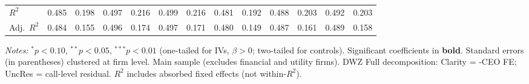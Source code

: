 \begin{landscape}
\begin{table}[H]
\begin{tabular}{lcccccccccccc}
$R^2$ & 0.485 & 0.198 & 0.497 & 0.216 & 0.499 & 0.216 & 0.481 & 0.192 & 0.488 & 0.203 & 0.492 & 0.203 \\
Adj.~$R^2$ & 0.484 & 0.155 & 0.496 & 0.174 & 0.497 & 0.171 & 0.480 & 0.149 & 0.487 & 0.161 & 0.489 & 0.158 \\
\bottomrule
\end{tabular}
\begin{minipage}{\linewidth}
\vspace{2pt}\scriptsize
\textit{Notes:} $^{*}p<0.10$, $^{**}p<0.05$, $^{***}p<0.01$ (one-tailed for IVs, $\beta > 0$; two-tailed for controls).
 Significant coefficients in \textbf{bold}.
 Standard errors (in parentheses) clustered at firm level.
 Main sample (excludes financial and utility firms). DWZ Full decomposition: Clarity = -CEO FE; UncRes = call-level residual.
 $R^2$ includes absorbed fixed effects (not within-$R^2$).
\end{minipage}
\end{table}
\end{landscape}